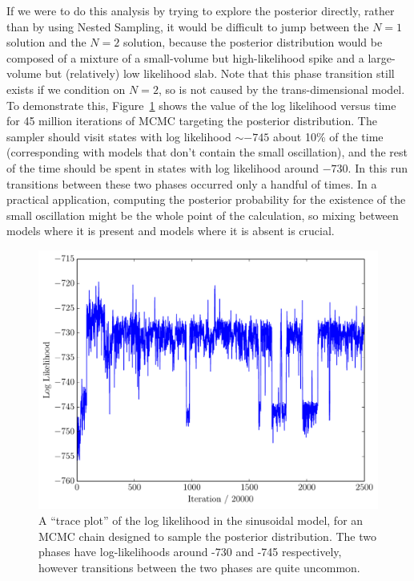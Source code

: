 \documentclass[letterpaper, 11pt]{article}
\begin{document}
If we were to do this analysis by trying to explore the posterior directly,
rather than by using Nested Sampling, it would be difficult to jump between
the $N=1$ solution and the $N=2$ solution, because the posterior distribution
would be composed of a mixture of a small-volume but high-likelihood spike
and a large-volume but (relatively) low likelihood
slab. Note that this phase transition still exists if we condition on $N=2$,
so is not caused by the trans-dimensional model. To demonstrate this,
Figure~\ref{fig:trace_logl} shows the value of the log likelihood versus time
for 45 million iterations of MCMC targeting the posterior distribution.
The sampler should visit states with log likelihood $\sim -745$ about 10\%
of the time (corresponding with models that don't contain the small oscillation),
and the rest of the time should be spent in states with log likelihood around
$-730$. In this run transitions between these two phases occurred only a
handful of times. In a practical application, computing the posterior probability
for the existence of the small oscillation might be the whole point of the
calculation, so mixing between models where it is present and models where it
is absent is crucial.

\begin{figure}
\begin{center}
\includegraphics[scale=0.5]{trace_logl.pdf}
\caption{A ``trace plot'' of the log likelihood in the sinusoidal model, for an
MCMC chain designed to sample the posterior distribution. The two phases
have log-likelihoods around -730 and -745 respectively, however transitions
between the two phases are quite uncommon.
\label{fig:trace_logl}}
\end{center}
\end{figure}
\end{document}
